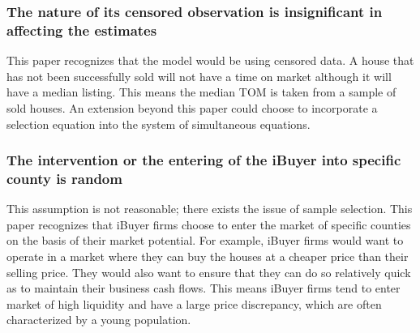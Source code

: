 \subsubsection{The nature of its censored observation is insignificant in affecting the estimates}

This paper recognizes that the model would be using censored data. A house that has not been successfully sold will not have a time on market although it will have a median listing. This means the median TOM is taken from a sample of sold houses. An extension beyond this paper could choose to incorporate a selection equation into the system of simultaneous equations.  

\subsubsection{The intervention or the entering of the iBuyer into specific county is random}

This assumption is not reasonable; there exists the issue of sample selection. This paper recognizes that iBuyer firms choose to enter the market of specific counties on the basis of their market potential. For example, iBuyer firms would want to operate in a market where they can buy the houses at a cheaper price than their selling price. They would also want to ensure that they can do so relatively quick as to maintain their business cash flows. This means iBuyer firms tend to enter market of high liquidity and have a large price discrepancy, which are often characterized by a young population.  
